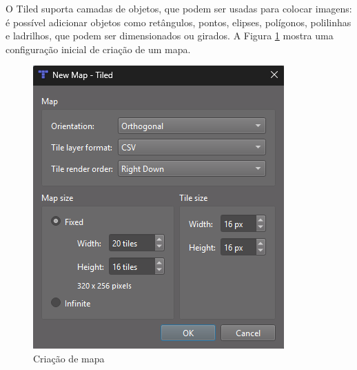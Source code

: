 O Tiled suporta camadas de objetos, que podem ser usadas para colocar imagens: é possível adicionar objetos como retângulos, pontos, elipses, polígonos, polilinhas e ladrilhos, que podem ser dimensionados ou girados. A Figura \ref{fig:map-creation} mostra uma configuração inicial de criação de um mapa.
\begin{figure}[h!]
    \centering
    \includegraphics[width=0.5\linewidth]{figuras/new-map-tiled.png}
    \caption{Criação de mapa}
    \label{fig:map-creation}
\end{figure}
